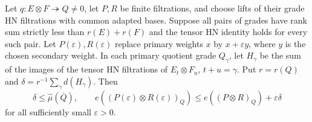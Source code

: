 \begin{lemma}
\label{lem:component-hn-variation}
\leanok
Let $q:E\otimes F\twoheadrightarrow Q\ne0$, let $P,R$ be finite
filtrations, and choose lifts of their grade HN filtrations with common
adapted bases. Suppose all pairs of grades have rank sum strictly less
than $r(E)+r(F)$ and the tensor HN identity holds for every such pair.
Let $P(\varepsilon),R(\varepsilon)$ replace primary weights $x$ by
$x+\varepsilon y$, where $y$ is the chosen secondary weight. In each
primary quotient grade $Q_\gamma$, let $H_\gamma$ be the sum of the
images of the tensor HN filtrations of $E_t\otimes F_u$, $t+u=\gamma$.
Put $r=r(Q)$ and $\delta=r^{-1}\sum_\gamma d(H_\gamma)$. Then
\[
 \delta\le\widehat\mu(\overline Q),\qquad
 e((P(\varepsilon)\otimes R(\varepsilon))_Q)
 \le e((P\otimes R)_Q)+\varepsilon\delta
\]
for all sufficiently small $\varepsilon>0$.
\end{lemma}
